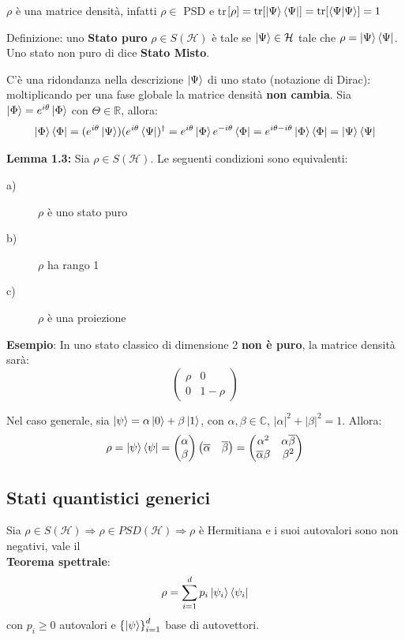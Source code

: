 \documentclass{report}
\begin{document}
$\rho$ è una matrice densità, infatti $\rho \in$ PSD e tr$[\rho] = \text{tr}[\ket{\Psi}\bra{\Psi}]=\text{tr}[\braket{\Psi|\Psi}]=1$


Definizione: uno \textbf{Stato puro} $\rho \in S(\mathcal{H})$ è tale se $\ket{\Psi} \in \mathcal{H}$ tale che $\rho = \ket{\Psi}\bra{\Psi}$. Uno stato non puro di dice \textbf{Stato Misto}.

C'è una ridondanza nella descrizione $\ket{\Psi}$ di uno stato (notazione di Dirac): moltiplicando per una fase globale la matrice densità \textbf{non cambia}. Sia $\ket{\Phi}= e^{i\theta}\ket{ \Phi}$ con $\Theta \in \mathbb{R}$, allora:
$$\ket{\Phi}\bra{\Phi} = (e^{i\theta}\ket{\Psi})(e^{i\theta}\bra{\Psi})^{\dagger} = 
e^{i\theta}\ket{ \Phi}e^{-i\theta}\bra{\Phi} = e^{i\theta-i\theta}\ket{ \Phi}\bra{\Phi}=
\ket{\Psi} \bra{\Psi}$$

\textbf{Lemma 1.3:} Sia $\rho\in S(\mathcal{H})$. Le seguenti condizioni sono equivalenti:
\begin{description}
    \item[a)] $\rho$ è uno stato puro
    \item[b)] $\rho$ ha rango 1
    \item[c)] $\rho$ è una proiezione
\end{description}

\textbf{Esempio}: In uno stato classico di dimensione 2 \textbf{non è puro}, la matrice densità sarà:
$$
\begin{pmatrix}
	\rho & 0\\
	0 & 1 - \rho
\end{pmatrix}
$$

Nel caso generale, sia $\ket{\psi}= \alpha\ket{0}+\beta\ket{1}$, con $\alpha, \beta \in \mathbb{C}$, $|\alpha|^2 + |\beta|^2=1$. Allora:
$$\rho= \ket{\psi}\bra{\psi}= 
\begin{pmatrix}
    \alpha \\
    \beta
\end{pmatrix}
\begin{pmatrix}
    \overline{\alpha} & \overline{\beta}
\end{pmatrix}
= \begin{pmatrix}
    \alpha^2 & \alpha\overline{\beta}\\
    \overline{\alpha}\beta & \beta^2
\end{pmatrix}
$$

\subsection{Stati quantistici generici}
Sia $\rho \in S(\mathcal{H}) \Rightarrow \rho \in \textit{PSD}(\mathcal{H}) \Rightarrow \rho$ è Hermitiana e i suoi autovalori sono non negativi, vale il \\\textbf{Teorema spettrale}:
$$\rho = \sum^d_{i=1}p_i \ket{\psi_i}\bra{\psi_i}$$
con $p_i\ge 0$ autovalori e $\left\{ \ket{\psi} \right\}^d_{i=1}$ base di autovettori.
\end{document}
